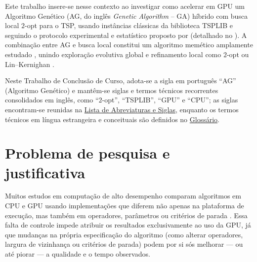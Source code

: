 Este trabalho insere-se nesse contexto ao investigar como acelerar em GPU um Algoritmo Genético (AG, do inglês \emph{Genetic Algorithm} -- GA) híbrido com busca local \(2\)-opt para o TSP, usando instâncias clássicas da biblioteca TSPLIB \autocite{reinelt1991tsplib} e seguindo o protocolo experimental e estatístico proposto por \textcite{demsar2006statistical} (detalhado no ).
A combinação entre AG e busca local constitui um algoritmo memético amplamente estudado \autocite{larranaga1999genetic,goldberg1989genetic}, unindo exploração evolutiva global e refinamento local como \(2\)-opt \autocite{croes1958method} ou Lin--Kernighan \autocite{lin1973efficient}.

Neste Trabalho de Conclusão de Curso, adota-se a sigla em português ``AG'' (Algoritmo Genético) e mantêm-se siglas e termos técnicos recorrentes consolidados em inglês, como ``\(2\)-opt'', ``TSPLIB'', ``GPU'' e ``CPU''; as siglas encontram-se reunidas na \hyperref[lista-de-siglas]{Lista de Abreviaturas e Siglas}, enquanto os termos técnicos em língua estrangeira e conceituais são definidos no \hyperref[glossario]{Glossário}.

\section{Problema de pesquisa e justificativa}\label{sec-12-problema-de-pesquisa}
\label{sec-15-justificativa}

Muitos estudos em computação de alto desempenho comparam algoritmos em CPU e GPU usando implementações que diferem não apenas na plataforma de execução, mas também em operadores, parâmetros ou critérios de parada \autocite{schulz2013gpu,van2013gpu,benaini2018genetic}.
Essa falta de controle impede atribuir os resultados exclusivamente ao uso da GPU, já que mudanças na própria especificação do algoritmo (como alterar operadores, largura de vizinhança ou critérios de parada) podem por si sós melhorar --- ou até piorar --- a qualidade e o tempo observados.

